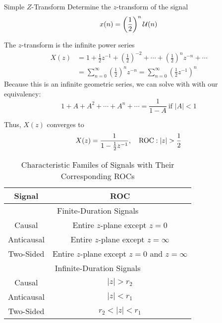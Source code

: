 \begin{example}[]{Simple $Z$-Transform}
  Determine the $z$-transform of the signal
  \begin{equation*}
    x(n) = \left( \frac{1}{2} \right)^{n} \operatorname{\mathcal{U}}(n)
  \end{equation*}

  \tcblower

  The $z$-transform is the infinite power series
  \begin{equation*}
    \begin{aligned}
      X(z) &= 1 + \frac{1}{2}z^{-1} + {\left( \frac{1}{2} \right)}^{-2} + \cdots + {\left( \frac{1}{2} \right)}^{n}z^{-n} + \cdots \\
      &= \sum_{n=0}^{\infty} {\left( \frac{1}{2} \right)}^{n}z^{-n} = \sum_{n=0}^{\infty} {\left( \frac{1}{2}z^{-1} \right)}^{n}
    \end{aligned}
  \end{equation*}
  Because this is an infinite geometric series, we can solve with with our equivalency:
  \begin{equation*}
    1 + A + A^{2} + \cdots + A^{n} + \cdots = \frac{1}{1-A} \> \text{if } \lvert A \rvert < 1
  \end{equation*}

  Thus, $X(z)$ converges to
  \begin{equation*}
    X(z) = \frac{1}{1-\frac{1}{2}z^{-1}}, \quad \operatorname{\mathrm{ROC}}: \lvert z \rvert > \frac{1}{2}
  \end{equation*}
\end{example}

\begin{table}[h!]
  \centering
  \begin{tabular}{cc}
    \toprule
    Signal & ROC \\
    \midrule
    \multicolumn{2}{c}{Finite-Duration Signals} \\
    Causal & Entire $z$-plane except $z=0$ \\
    Anticausal & Entire $z$-plane except $z=\infty$ \\
    Two-Sided & Entire $z$-plane except $z=0$ and $z=\infty$ \\
    \midrule
    \multicolumn{2}{c}{Infinite-Duration Signals} \\
    Causal & $\lvert z \rvert > r_{2}$ \\
    Anticausal & $\lvert z \rvert < r_{1}$ \\
    Two-Sided & $r_{2} < \lvert z \rvert < r_{1}$ \\
    \bottomrule
  \end{tabular}
  \caption{Characteristic Familes of Signals with Their Corresponding ROCs}
  \label{tab:Z-Transform ROC Correspondence}
\end{table}

